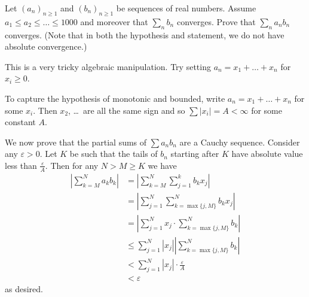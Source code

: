 \begin{problem}
	\onechili
	Let $(a_n)_{n \ge 1}$ and $(b_n)_{n \ge 1}$ be sequences of real numbers.
	Assume $a_1 \le a_2 \le \dots \le 1000$
	and moreover that $\sum_n b_n$ converges.
	Prove that $\sum_n a_n b_n$ converges.
	(Note that in both the hypothesis and statement,
	we do not have absolute convergence.)
	\begin{hint}
		This is a very tricky algebraic manipulation.
		Try setting $a_n = x_1 + \dots + x_n$ for $x_i \ge 0$.
	\end{hint}
	\begin{sol}
		To capture the hypothesis of monotonic and bounded,
		write $a_n = x_1 + \dots + x_n$ for some $x_i$.
		Then $x_2$, \dots\ are all the same sign and so $\sum |x_i| = A < \infty$
		for some constant $A$.

		We now prove that the partial sums of $\sum a_n b_n$ are a Cauchy sequence.
		Consider any $\varepsilon > 0$.
		Let $K$ be such that the tails of $b_n$
		starting after $K$ have absolute value less than $\frac{\varepsilon}{A}$.
		Then for any $N > M \ge K$ we have
		\begin{align*}
			\left\lvert \sum_{k=M}^N a_k b_k \right\rvert
			&= \left\lvert \sum_{k=M}^N \sum_{j=1}^k b_k x_j \right\rvert \\
			&= \left\lvert \sum_{j=1}^N \sum_{k=\max\{j,M\}}^N b_k x_j \right\rvert \\
			&= \left\lvert \sum_{j=1}^N x_j \cdot \sum_{k=\max\{j,M\}}^N b_k\right\rvert \\
			&\le \sum_{j=1}^N |x_j| \left\lvert \sum_{k=\max\{j,M\}}^N b_k \right\rvert \\
			&< \sum_{j=1}^N |x_j| \cdot \frac{\varepsilon}{A} \\
			&< \varepsilon
		\end{align*}
		as desired.
	\end{sol}
\end{problem}


